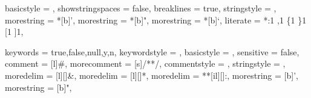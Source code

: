 \makeatletter
{}
\makeatother

\usepackage{graphicx}
\usepackage{graphbox}
\graphicspath{ {../assets/} }

\usepackage{hyperref}
\usepackage{cleveref}
\usepackage{nameref}

\usepackage[
  binary-units = true,
  per-mode     = symbol,
]{siunitx}

\usepackage{listing}



 {
  basicstyle        = \normalfont\ttfamily,
  showstringspaces  = false,
  breaklines        = true,
  stringstyle       = \color{green(ncs)},
  morestring        = *[b]{'},
  morestring        = *[b]{"},
  morestring        = *[b]{`},
  literate          =
    *{:}{{{\color{punct}{:}}}}{1}
    {,}{{{\color{punct}{,}}}}{1}
    {\{}{{{\color{delim}{\{}}}}{1}
    {\}}{{{\color{delim}{\}}}}}{1}
    {[}{{{\color{delim}{[}}}}{1}
    {]}{{{\color{delim}{]}}}}{1},
}

\newcommand\YAMLcolonstyle{\color{red}\mdseries}
\newcommand\YAMLkeystyle{\color{black}\bfseries}
\newcommand\YAMLvaluestyle{\color{auburn}\mdseries}

 {
  keywords      = {true,false,null,y,n},
  keywordstyle  = \color{gray},
  basicstyle    = \normalfont\ttfamily,
  sensitive     = false,
  comment       = [l]{\#},
  morecomment   = [s]{/*}{*/},
  commentstyle  = \color{purple},
  stringstyle   = \color{green(ncs)},
  moredelim     = [l][\color{orange}]{\&},
  moredelim     = [l][\color{magenta}]{*},
  moredelim     = **[il][\YAMLcolonstyle{:}\YAMLvaluestyle]{:},
  morestring    = [b]',
  morestring    = [b]",
}


